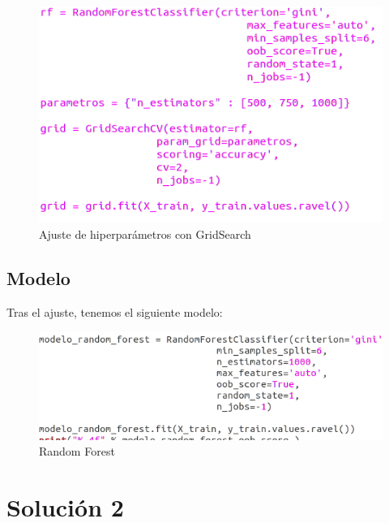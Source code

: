  \begin{figure}[H] %
	\centering
	\includegraphics[scale=0.4]{grid.png}  %
	\caption{Ajuste de hiperparámetros con GridSearch} 
	\label{fig:grid}
\end{figure}

\newpage

\subsection{Modelo}

Tras el ajuste, tenemos el siguiente modelo:

 \begin{figure}[H] %
	\centering
	\includegraphics[scale=0.4]{rf.png}  %
	\caption{Random Forest} 
	\label{fig:RF}
\end{figure}

 
\section{Solución 2}

